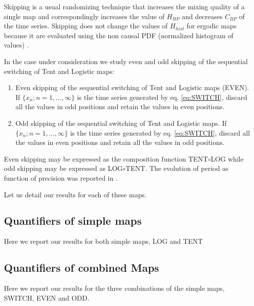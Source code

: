 Skipping is a usual randomizing technique that increases the mixing quality of a single map and correspondingly increases the value of $H_{BP}$ and decreases $C_{BP} $ of the time series.
Skipping does not change the values of $H_{hist}$ for ergodic maps because it are evaluated using the non causal PDF (normalized histogram of values) \cite{DeMicco2008}.

In the case under consideration we study even and odd skipping of the sequential switching of Tent and Logistic maps:
\begin{enumerate}
	\item Even skipping of the sequential switching of Tent and Logistic maps (EVEN).\\
	If $\{x_n; n=1,\dots,\infty\}$ is the time series generated by eq. \eqref{eq:SWITCH}, discard all the values in odd positions and retain the values in even positions.
	\item Odd skipping of the sequential switching of Tent and Logistic maps.
	If $\{x_n; n=1,\dots,\infty\}$ is the time series generated by eq. \eqref{eq:SWITCH}, discard all the values in even positions and retain all the values in odd positions.
\end{enumerate}

Even skipping may be expressed as the composition function TENT$\circ$LOG while odd skipping may be expressed as LOG$\circ$TENT.
The evolution of period as function of precision was reported in \cite{Nagaraj2008}.

Let us detail our results for each of these maps.



\subsection {Quantifiers of simple maps}\label{subsec:SimpleMaps}
Here we report our results for both simple maps, LOG and TENT



 

\subsection{Quantifiers of combined Maps}\label{subsec:SecSwitch}
Here we report our results for the three combinations of the simple maps, SWITCH, EVEN and ODD.



